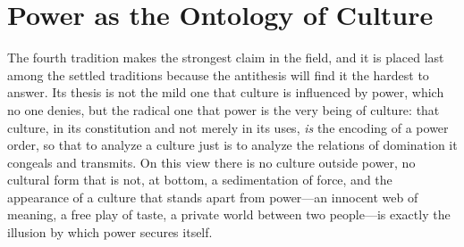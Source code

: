 \section{Power as the Ontology of Culture}
\label{p24:sec:power}

\noindent
The fourth tradition makes the strongest claim in the field, and it is placed last among the settled traditions because the antithesis will find it the hardest to answer. Its thesis is not the mild one that culture is influenced by power, which no one denies, but the radical one that power is the very being of culture: that culture, in its constitution and not merely in its uses, \emph{is} the encoding of a power order, so that to analyze a culture just is to analyze the relations of domination it congeals and transmits. On this view there is no culture outside power, no cultural form that is not, at bottom, a sedimentation of force, and the appearance of a culture that stands apart from power---an innocent web of meaning, a free play of taste, a private world between two people---is exactly the illusion by which power secures itself.

